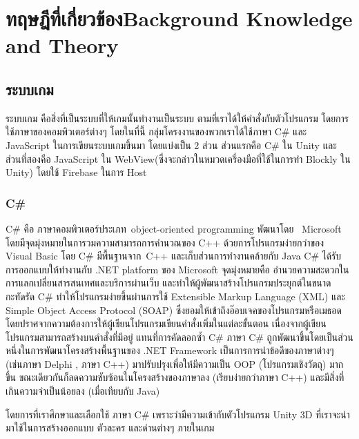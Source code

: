 \chapter{\ifcpe ทฤษฎีที่เกี่ยวข้อง\else Background Knowledge and Theory\fi}

\section{ระบบเกม}
ระบบเกม คือสิ่งที่เป็นระบบที่ให้เกมนั้นทำงานเป็นระบบ 
ตามที่เราได้ให้คำสั่งกับตัวโปรแกรม 
โดยการใช้ภาษาของคอมพิวเตอร์ต่างๆ 
โดยในที่นี้ กลุ่มโครงงานของพวกเราได้ใช้ภาษา C\# และ JavaScript 
ในการเขียนระบบเกมขึ้นมา โดยแบ่งเป็น 2 ส่วน ส่วนแรกคือ C\# ใน Unity 
และ ส่วนที่สองคือ JavaScript ใน WebView(ซึ่งจะกล่าวในหมวดเครื่องมือที่ใช้ในการทำ Blockly ใน Unity) โดยใช้ Firebase ในการ Host\par

\subsection{C\#}
C\# คือ ภาษาคอมพิวเตอร์ประเภท  object-oriented programming พัฒนาโดย
  Microsoft โดยมีจุดมุ่งหมายในการวมความสามารถการคำนวณของ 
C++ ด้วยการโปรแกรมง่ายกว่าของ Visual Basic โดย C\# มีพื้นฐานจาก 
C++ และเก็บส่วนการทำงานคล้ายกับ Java 
C\# ได้รับการออกแบบให้ทำงานกับ .NET platform ของ Microsoft
จุดมุ่งหมายคือ อำนวยความสะดวกในการแลกเปลี่ยนสารสนเทศและบริการผ่านเว็บ 
และทำให้ผู้พัฒนาสร้างโปรแกรมประยุกต์ในขนาดกะทัดรัด C\# 
ทำให้โปรแกรมง่ายขึ้นผ่านการใช้ Extensible Markup Language (XML) 
และ Simple Object Access Protocol (SOAP) 
ซึ่งยอมให้เข้าถึงอ๊อบเจคของโปรแกรมหรือเมธอด 
โดยปราศจากความต้องการให้ผู้เขียนโปรแกรมเขียนคำสั่งเพิ่มในแต่ละขั้นตอน 
เนื่องจากผู้เขียนโปรแกรมสามารถสร้างบนคำสั่งที่มีอยู่ 
แทนที่การคัดลอกซ้ำ C\#
ภาษา C\# ถูกพัฒนาขึ้นโดยเป็นส่วนหนึ่งในการพัฒนาโครงสร้างพื้นฐานของ
.NET Framework เป็นการการนำข้อดีของภาษาต่างๆ 
(เช่นภาษา Delphi , ภาษา C++) มาปรับปรุงเพื่อให้มีความเป็น OOP 
(โปรแกรมเชิงวัตถุ) มากขึ้น ขณะเดียวกันก็ลดความซับซ้อนในโครงสร้างของภาษาลง (เรียบง่ายกว่าภาษา C++) 
และมีสิ่งที่เกินความจำเป็นน้อยลง (เมื่อเทียบกับ Java)~\cite{cs}\par
โดยการที่เราศึกษาและเลือกใช้ ภาษา C\# เพราะว่ามีความเข้ากับตัวโปรแกรม 
Unity 3D ที่เราจะนำมาใช้ในการสร้างออกแบบ ตัวละคร และด่านต่างๆ ภายในเกม\newline
